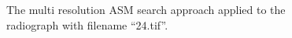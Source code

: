 \documentclass[a4paper]{article}
\begin{document}
\begin{figure}[!tbp]
  \centering
  \begin{adjustbox}{center}
  \end{adjustbox}
  \caption{The multi resolution ASM search approach applied to the radiograph with filename ``24.tif''.}
  \label{fig:multi-resolution-search-example}
\end{figure}
\bigskip
\end{document}
